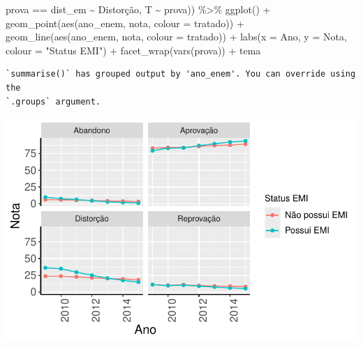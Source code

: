 \documentclass[
  letterpaper,
  DIV=11,
  numbers=noendperiod]{scrartcl}
\newenvironment{Shaded}{\begin{snugshade}}{\end{snugshade}}
\newcommand{\AttributeTok}[1]{\textcolor[rgb]{0.40,0.45,0.13}{#1}}
\newcommand{\FunctionTok}[1]{\textcolor[rgb]{0.28,0.35,0.67}{#1}}
\newcommand{\NormalTok}[1]{\textcolor[rgb]{0.00,0.23,0.31}{#1}}
\newcommand{\SpecialCharTok}[1]{\textcolor[rgb]{0.37,0.37,0.37}{#1}}
\newcommand{\StringTok}[1]{\textcolor[rgb]{0.13,0.47,0.30}{#1}}
\begin{document}
\begin{Shaded}
\begin{Highlighting}[]
\NormalTok{                           prova }\SpecialCharTok{==} \StringTok{\textquotesingle{}dist\_em\textquotesingle{}} \SpecialCharTok{\textasciitilde{}} \StringTok{\textquotesingle{}Distorção\textquotesingle{}}\NormalTok{,}
\NormalTok{                           T }\SpecialCharTok{\textasciitilde{}}\NormalTok{ prova)) }\SpecialCharTok{\%\textgreater{}\%} 
  \FunctionTok{ggplot}\NormalTok{() }\SpecialCharTok{+}
  \FunctionTok{geom\_point}\NormalTok{(}\FunctionTok{aes}\NormalTok{(ano\_enem, nota, }\AttributeTok{colour =}\NormalTok{ tratado)) }\SpecialCharTok{+}
  \FunctionTok{geom\_line}\NormalTok{(}\FunctionTok{aes}\NormalTok{(ano\_enem, nota, }\AttributeTok{colour =}\NormalTok{ tratado)) }\SpecialCharTok{+}
  \FunctionTok{labs}\NormalTok{(}\AttributeTok{x =} \StringTok{\textquotesingle{}Ano\textquotesingle{}}\NormalTok{, }\AttributeTok{y =} \StringTok{\textquotesingle{}Nota\textquotesingle{}}\NormalTok{, }\AttributeTok{colour =} \StringTok{"Status EMI"}\NormalTok{) }\SpecialCharTok{+}
  \FunctionTok{facet\_wrap}\NormalTok{(}\FunctionTok{vars}\NormalTok{(prova)) }\SpecialCharTok{+}
\NormalTok{  tema}
\end{Highlighting}
\end{Shaded}

\begin{verbatim}
`summarise()` has grouped output by 'ano_enem'. You can override using the
`.groups` argument.
\end{verbatim}

\includegraphics{script_files/figure-latex/unnamed-chunk-6-1.pdf}
\end{document}
